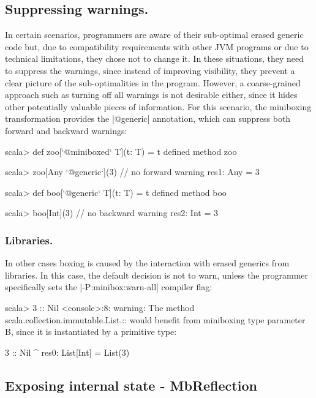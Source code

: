 \subsection{Suppressing warnings.} In certain scenarios, programmers are aware of their sub-optimal erased generic code but, due to compatibility requirements with other JVM programs or due to technical limitations, they chose not to change it. In these situations, they need to suppress the warnings, since instead of improving visibility, they prevent a clear picture of the sub-optimalities in the program. However, a coarse-grained approach such as turning off all warnings is not desirable either, since it hides other potentially valuable pieces of information. For this scenario, the miniboxing transformation provides the |@generic| annotation, which can suppress both forward and backward warnings:

\begin{lstlisting-nobreak}
scala> def zoo[`@miniboxed` T](t: T) = t
defined method zoo

scala> zoo[Any `@generic`](3) // no forward warning
res1: Any = 3

scala> def boo[`@generic` T](t: T) = t
defined method boo

scala> boo[Int](3)                   // no backward warning
res2: Int = 3
\end{lstlisting-nobreak}


\subsubsection{Libraries.} In other cases boxing is caused by the interaction with erased generics from libraries. In this case, the default decision is not to warn, unless the programmer specifically sets the |-P:minibox:warn-all| compiler flag:

\begin{lstlisting-nobreak}
scala> 3 :: Nil
<console>:8: warning: The method scala.collection.immutable.List.:: would benefit from miniboxing type parameter B, since it is instantiated by a primitive type:

              3 :: Nil
                ^
res0: List[Int] = List(3)
\end{lstlisting-nobreak}



\subsection{Exposing internal state - MbReflection}

